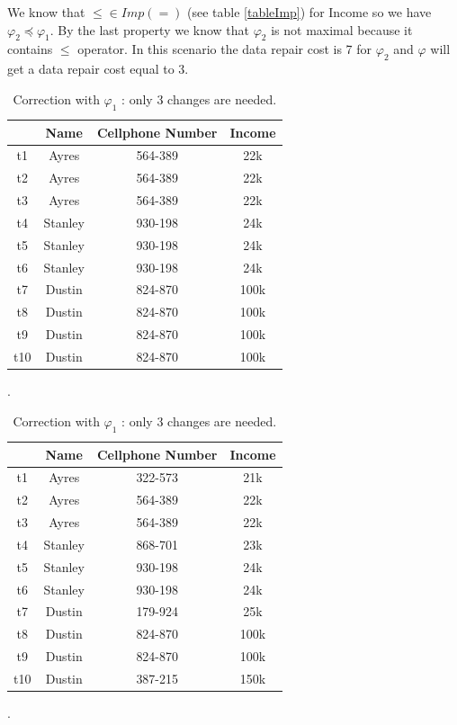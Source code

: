\documentclass[letterpaper, 12pt]{report}
\begin{document}
We know that $\leq \in Imp(=)$ (see table \ref{tableImp}) for Income so we have $\varphi_2 \preceq \varphi_1$. By the last property we know that $\varphi_2$ is not maximal because it contains $\leq$ operator. In this scenario the data repair cost is 7 for $\varphi_2$ and $\varphi$ will get a data repair cost equal to 3. 

\begin{table}[H]
	\parbox{.45\linewidth}{
	\centering
	\begin{tabular}{|c|c c c|}
	\hline
	    & Name & Cellphone Number & Income\\
	\hline
	 t1 & Ayres & \color{red}564-389 & \color{red}22k\\
	 t2 & Ayres & \color{red}564-389 & 22k\\
	 t3 & Ayres & 564-389 & 22k\\
	 t4 & Stanley &\color{red} 930-198 &\color{red}24k\\
	 t5 & Stanley &\color{red} 930-198 & 24k\\
	 t6 & Stanley & 930-198 & 24k\\
	 t7 & Dustin & \color{red}824-870 & \color{red}100k\\
	 t8 & Dustin & \color{red}824-870 & 100k\\
	 t9 & Dustin & 824-870 & 100k\\
	 t10 & Dustin & \color{red}824-870 & \color{red}100k\\
	 \hline
	\end{tabular}
	\caption{Correction with $\varphi_2$: 7 changes needed only for the collumn CP.}.
	}
	\hfill
	\parbox{.45\linewidth}{
	\centering
	\begin{tabular}{|c|c c c|}
	\hline
	    & Name & Cellphone Number & Income\\
	\hline
	 t1 & Ayres & 322-573 & 21k\\
	 t2 & Ayres & \color{red} 564-389 & 22k\\
	 t3 & Ayres & 564-389 & 22k\\
	 t4 & Stanley & 868-701 &23k\\
	 t5 & Stanley & \color{red} 930-198 & 24k\\
	 t6 & Stanley & 930-198 & 24k\\
	 t7 & Dustin & 179-924 & 25k\\
	 t8 & Dustin & \color{red} 824-870 & 100k\\
	 t9 & Dustin & 824-870 & 100k\\
	 t10 & Dustin & 387-215 & 150k\\
	 \hline
	\end{tabular}
	\caption{Correction with $\varphi_1$ : only 3 changes are needed.}.
	}
\end{table}
\end{document}
